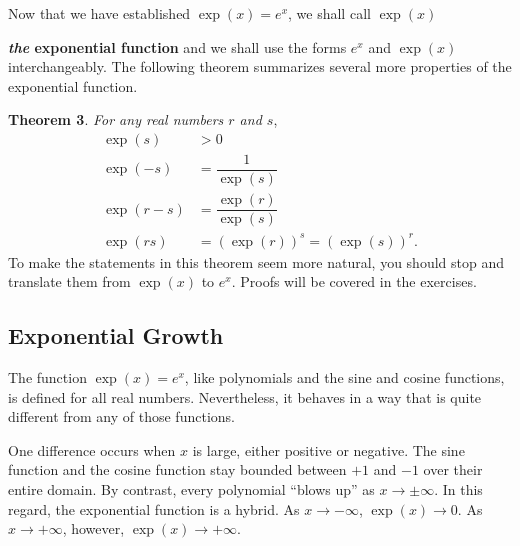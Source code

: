 Now that we have established $\exp(x) = e^x$, we shall call $\exp(x)$

{\bf \emph{the} exponential function} and we shall use the forms $e^x$ and
$\exp(x)$ interchangeably.  The following theorem summarizes several
more properties of the exponential
function.





{\bf Theorem 3}.  {\em For any real numbers\/ $r$ and\/ $s$}, 
	\begin{align*}
	\exp(s) &> 0 \\
	\exp(-s) &= \dfrac{1}{\exp(s)} \\[3pt]
	\exp(r - s) &= \dfrac{\exp(r)}{\exp(s)} \\[3pt]
	\exp(rs) &= \left( \exp(r) \right)^{\displaystyle s} 
		= \left( \exp(s) \right)^{\displaystyle r}.
	\end{align*}
To make the statements in this theorem seem more natural, you should
stop and translate them from $\exp(x)$ to $e^x$.  Proofs will be
covered in the exercises.


\subsection{Exponential Growth}
\label{subsec:exponential-growth}

The function $\exp(x) = e^x$, like polynomials and the sine and cosine
functions, is defined for all real numbers.  Nevertheless, it behaves
in a way that is quite different from any of those functions.

One difference occurs when $x$ is large, either positive or negative.
The sine function and the cosine function stay bounded between $+1$
and $-1$ over their entire domain.  By contrast, every polynomial
``blows up'' as $x \to \pm \infty$.  In this regard, the exponential
function is a hybrid.  As $x \to -\infty$, $\exp(x) \to 0$.  As $x \to
+ \infty$, however, $\exp(x) \to +\infty$.

